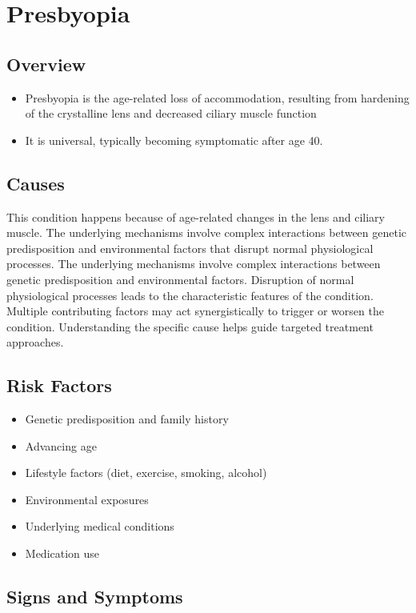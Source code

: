 \chapter{Presbyopia}
\label{sec:Presbyopia}

\section{Overview}


\begin{itemize}[noitemsep]
  \item Presbyopia is the age-related loss of accommodation, resulting from hardening of the crystalline lens and decreased ciliary muscle function
  \item It is universal, typically becoming symptomatic after age 40.
\end{itemize}
\section{Causes}
This condition happens because of age-related changes in the lens and ciliary muscle. The underlying mechanisms involve complex interactions between genetic predisposition and environmental factors that disrupt normal physiological processes. The underlying mechanisms involve complex interactions between genetic predisposition and environmental factors. Disruption of normal physiological processes leads to the characteristic features of the condition. Multiple contributing factors may act synergistically to trigger or worsen the condition. Understanding the specific cause helps guide targeted treatment approaches.
\section{Risk Factors}


\begin{itemize}[noitemsep]
  \item Genetic predisposition and family history
  \item Advancing age
  \item Lifestyle factors (diet, exercise, smoking, alcohol)
  \item Environmental exposures
  \item Underlying medical conditions
  \item Medication use
\end{itemize}
\section{Signs and Symptoms}

